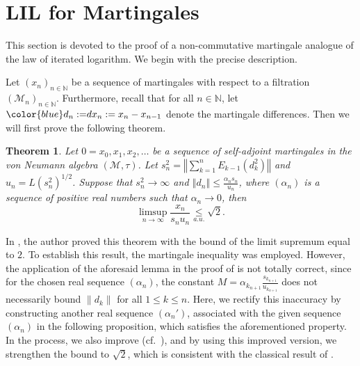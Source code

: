 \documentclass[10pt]{amsart}
\newtheorem{thm}{Theorem}[section]
\theoremstyle{definition}
\theoremstyle{myremark}
\numberwithin{equation}{section}
\def\N{\mathbb N}
\newcommand{\CM}{\mathcal{M}}
\newcommand{\norm}[1]{\left\Vert#1\right\Vert}
\begin{document}
\section{LIL for Martingales}\label{sec: main sec}

This section is devoted to the proof of a non-commutative martingale analogue of the law of iterated logarithm. We begin with the precise description. 

Let $(x_n)_{n \in \N}$ be a sequence of martingales with respect to a filtration $(\CM_n)_{n \in \N}$. Furthermore, recall that for all $n \in \N$, let ${\color{blue}d_n:=} dx_n:= x_n - x_{n-1}$ denote the martingale differences. Then we will first prove the following theorem.

\begin{thm}\label{thm: main thm}
    Let $0=x_0, x_1, x_2, \ldots$ be a sequence of self-adjoint martingales in the von Neumann algebra $(\mathcal{M}, \tau)$. Let $s_n^2=\norm{\sum_{k=1}^n E_{k-1}(d_k^2)}$ and $u_n=L(s_n^2)^{1/2}$. Suppose that $s_n^2 \to \infty$ and $\norm{d_n} \leq \frac{\alpha_n s_n}{u_n}$, where $(\alpha_n)$ is a sequence of positive {\color{blue} real} numbers such that $\alpha_n \to 0$, then 
    \[
    \limsup_{n \to \infty} \frac{x_n}{s_n u_n} \underset{a.u.}{\leq }\sqrt{2}.
    \]
\end{thm}

In \cite{zeng2015kolmogorov}, the author proved this theorem with the bound of the limit 
supremum equal to $2$. To establish this result, the martingale inequality 
\cite[Lemma~3]{zeng2015kolmogorov} was employed. However, the application of the aforesaid 
lemma in the proof of \cite[Theorem~1]{zeng2015kolmogorov} is  not totally correct, since for the chosen 
real sequence $(\alpha_n)$, the constant 
$M = \alpha_{k_{n+1}} \frac{s_{k_{n+1}}}{u_{k_{n+1}}}
$
does not necessarily bound $\|d_k\|$ for all $1 \leq k \leq n$. Here, we rectify this inaccuracy by constructing another real sequence $(\alpha_n')$, 
associated with the given sequence $(\alpha_n)$ in the following proposition, which satisfies 
the aforementioned property. In the process, we also improve \cite[Lemma~3]{zeng2015kolmogorov} 
(cf.~), and by using this improved version, we strengthen the bound to 
$\sqrt{2}$, which is consistent with the classical result of \cite{stout1970hartman}.
\end{document}
